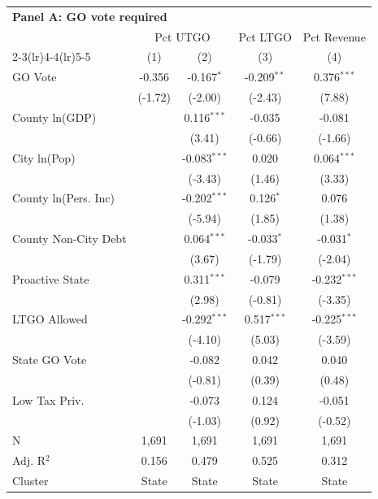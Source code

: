 \begingroup
\centering
\begin{tabular*}{\textwidth}{@{\extracolsep{\fill}}lcccc}
\multicolumn{5}{l}{\textbf{Panel A: GO vote required}}\\

\addlinespace
   \toprule
    & \multicolumn{2}{c}{Pct UTGO} & Pct LTGO & Pct Revenue\\
   \cmidrule(lr){2-3}\cmidrule(lr){4-4}\cmidrule(lr){5-5}
                        & (1)      & (2)            & (3)           & (4)\\  
   \midrule 
   GO Vote              & -0.356   & -0.167$^{*}$   & -0.209$^{**}$ & 0.376$^{***}$\\   
                        & (-1.72) & (-2.00)       & (-2.43)      & (7.88)\\   
   County ln(GDP)       &          & 0.116$^{***}$  & -0.035        & -0.081\\   
                        &          & (3.41)        & (-0.66)      & (-1.66)\\   
   City ln(Pop)         &          & -0.083$^{***}$ & 0.020         & 0.064$^{***}$\\   
                        &          & (-3.43)       & (1.46)       & (3.33)\\   
   County ln(Pers. Inc) &          & -0.202$^{***}$ & 0.126$^{*}$   & 0.076\\   
                        &          & (-5.94)       & (1.85)       & (1.38)\\   
   County Non-City Debt &          & 0.064$^{***}$  & -0.033$^{*}$  & -0.031$^{*}$\\   
                        &          & (3.67)        & (-1.79)      & (-2.04)\\   
   Proactive State      &          & 0.311$^{***}$  & -0.079        & -0.232$^{***}$\\   
                        &          & (2.98)        & (-0.81)      & (-3.35)\\   
   LTGO Allowed         &          & -0.292$^{***}$ & 0.517$^{***}$ & -0.225$^{***}$\\   
                        &          & (-4.10)       & (5.03)       & (-3.59)\\   
   State GO Vote        &          & -0.082         & 0.042         & 0.040\\   
                        &          & (-0.81)       & (0.39)       & (0.48)\\   
   Low Tax Priv.        &          & -0.073         & 0.124         & -0.051\\   
                        &          & (-1.03)       & (0.92)       & (-0.52)\\   
   \hline
   N         & 1,691    & 1,691          & 1,691         & 1,691\\  
   Adj. R$^2$       & 0.156    & 0.479          & 0.525         & 0.312\\  
   Cluster              & State & State & State & State\\  
   \bottomrule
\end{tabular*}
\par\endgroup
